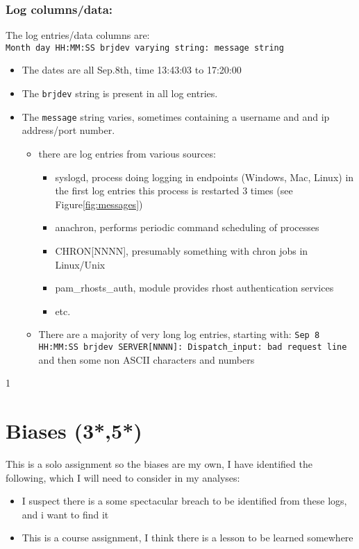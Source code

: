 \documentclass[
	letterpaper, %
	10pt, %
	unnumberedsections, %
	twoside, %
]{APAAssignment}
\begin{document}
\subsubsection{Log columns/data:} The log entries/data columns are: \\
\texttt{\textquotesingle{}Month\textquotesingle{}\ \textquotesingle{}day\textquotesingle{}\ \textquotesingle{}HH:MM:SS\textquotesingle{}\ \textquotesingle{}brjdev\textquotesingle{}\ \textquotesingle{}varying\ string\textquotesingle{}:\ \textquotesingle{}message\ string\textquotesingle{}}
\begin{itemize}
	\item The dates are all Sep.8th, time 13:43:03 to 17:20:00
	\item The \texttt{brjdev} string is present in all log entries.
	\item The \texttt{message} string varies, sometimes containing a username and and ip address/port number.
	      \begin{itemize}
		      \item there are log entries from various sources:
		            \begin{itemize}
			            \item syslogd, process doing logging in endpoints (Windows, Mac, Linux)\cite{syslog} in the first log entries this process is restarted 3 times (see Figure\ref{fig:messages})
			            \item anachron, performs periodic command scheduling of processes \cite{anacron}
			            \item CHRON[NNNN], presumably something with chron jobs in Linux/Unix
			            \item pam\_rhosts\_auth, module provides rhost authentication services\cite{pamRhostsAuth}
			            \item etc.
		            \end{itemize}
		      \item There are a majority of very long log entries, starting with: \texttt{Sep  8 HH:MM:SS brjdev SERVER[NNNN]: Dispatch\_input: bad request line} and then some non ASCII characters and numbers
	      \end{itemize}
\end{itemize}
1

\section{Biases (3*,5*)}
This is a solo assignment so the biases are my own, I have identified the following, which I will need to consider in my analyses:
\begin{itemize}
	\item I suspect there is a some spectacular breach to be identified from these logs, and i want to find it
	\item This is a course assignment, I think there is a lesson to be learned somewhere
\end{itemize}
\end{document}
